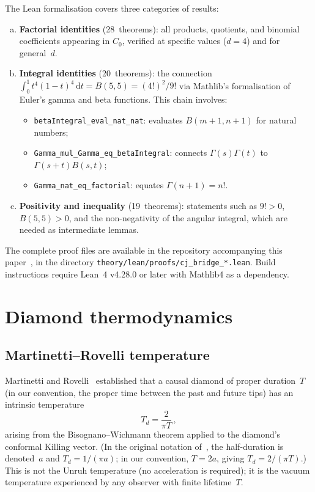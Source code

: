 \documentclass[12pt,a4paper]{article}
\theoremstyle{plain}
\theoremstyle{definition}
\theoremstyle{remark}
\newcommand{\dd}{\mathrm{d}}
\begin{document}
The Lean formalisation covers three categories of results:
\begin{enumerate}[(a)]
\item \textbf{Factorial identities} (28~theorems): all products,
  quotients, and binomial coefficients appearing in $C_0$, verified
  at specific values ($d = 4$) and for general~$d$.
\item \textbf{Integral identities} (20~theorems): the connection
  $\int_0^1 t^4(1-t)^4\,\dd t = B(5,5) = (4!)^2/9!$ via
  Mathlib's formalisation of Euler's gamma and beta functions.
  This chain involves:
  \begin{itemize}
  \item \texttt{betaIntegral\_eval\_nat\_nat}: evaluates
    $B(m+1, n+1)$ for natural numbers;
  \item \texttt{Gamma\_mul\_Gamma\_eq\_betaIntegral}: connects
    $\Gamma(s)\Gamma(t)$ to $\Gamma(s+t) B(s,t)$;
  \item \texttt{Gamma\_nat\_eq\_factorial}: equates
    $\Gamma(n+1) = n!$.
  \end{itemize}
\item \textbf{Positivity and inequality} (19~theorems): statements
  such as $9! > 0$, $B(5,5) > 0$, and the non-negativity of the
  angular integral, which are needed as intermediate lemmas.
\end{enumerate}

The complete proof files are available in the repository
accompanying this paper~\cite{Alfyorov:2026repo}, in the directory
\texttt{theory/lean/proofs/cj\_bridge\_*.lean}.  Build instructions
require Lean~4 v4.28.0 or later with Mathlib4 as a dependency.

\section{Diamond thermodynamics}
\label{sec:diamond}

\subsection{Martinetti--Rovelli temperature}

Martinetti and Rovelli~\cite{MartRov:2003} established that a
causal diamond of proper duration~$T$ (in our convention, the
proper time between the past and future tips) has an intrinsic
temperature
\begin{equation}\label{eq:diamond-temp}
  T_d = \frac{2}{\pi T}\,,
\end{equation}
arising from the Bisognano--Wichmann theorem applied to the
diamond's conformal Killing vector.  (In the original
notation of~\cite{MartRov:2003}, the half-duration is denoted~$a$
and $T_d = 1/(\pi a)$; in our convention, $T = 2a$, giving
$T_d = 2/(\pi T)$.)  This is not the Unruh temperature (no
acceleration is required); it is the vacuum temperature
experienced by any observer with finite lifetime~$T$.
\end{document}
